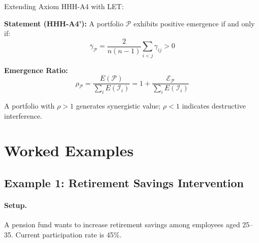 \begin{tcolorbox}[colback=blue!5!white, colframe=blue!75!black,
    title=Updated Axiom HHH-A4': Portfolio Emergence Condition]

Extending Axiom HHH-A4 with LET:

\textbf{Statement (HHH-A4'):} A portfolio $\mathcal{P}$ exhibits positive emergence if and only if:
\begin{equation}
\bar{\gamma}_{\mathcal{P}} = \frac{2}{n(n-1)} \sum_{i<j} \gamma_{ij} > 0
\end{equation}

\textbf{Emergence Ratio:}
\begin{equation}
\rho_{\mathcal{P}} = \frac{E(\mathcal{P})}{\sum_i E(\mathcal{I}_i)} = 1 + \frac{\mathcal{E}_{\mathcal{P}}}{\sum_i E(\mathcal{I}_i)}
\end{equation}

A portfolio with $\rho > 1$ generates synergistic value; $\rho < 1$ indicates destructive interference.

\end{tcolorbox}



\section{Worked Examples}
\label{sec:hhh-example}

\subsection{Example 1: Retirement Savings Intervention}

\paragraph{Setup.} A pension fund wants to increase retirement savings among employees aged 25--35. Current participation rate is 45\%.

